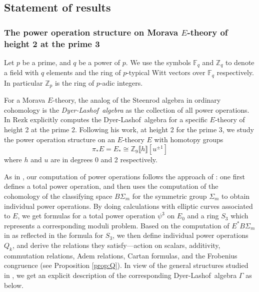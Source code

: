 \documentclass{gtpart}
\theoremstyle{definition}
\theoremstyle{remark}
\newcommand{\mb}[1]{\mathbb{#1}}
\newcommand{\DL}{Dyer-Lashof~}
\newcommand{\BF}{{\mb F}}
\newcommand{\BZ}{{\mb Z}}
\newcommand{\G}{\Gamma}
\newcommand{\p}{\psi^3}
\numberwithin{equation}{section}
\numberwithin{thm}{section}
\begin{document}
\subsection{Statement of results}
\label{subsec:res}

\subsubsection*{The power operation structure on Morava $E$-theory of height 2 at the prime 3}

Let $p$ be a prime, and $q$ be a power of $p$.  We use the symbols 
$\BF_q$ and $\BZ_q$ to denote a field with $q$ elements and the ring of 
$p$-typical Witt vectors over $\BF_q$ respectively.  In particular 
$\BZ_p$ is the ring of $p$-adic integers.  

For a Morava $E$-theory, the analog of the Steenrod algebra in ordinary 
cohomology is the {\em \DL algebra} as the collection of all power 
operations.  In \cite{h2p2} Rezk explicitly computes the \DL algebra for 
a specific $E$-theory of height 2 at the prime 2.  Following his work, 
at height 2 for the prime 3, we study the power operation structure on 
an $E$-theory $E$ with homotopy groups 
\[
 \pi_* E = E_* \cong \BZ_9 \llbracket h \rrbracket [u^{\pm 1}] 
\]
where $h$ and $u$ are in degrees 0 and 2 respectively.  

As in \cite{h2p2}, our computation of power operations follows the 
approach of \cite{steenrod}: one first defines a total power operation, 
and then uses the computation of the cohomology of the classifying space 
$B\Sigma_m$ for the symmetric group $\Sigma_m$ to obtain individual 
power operations.  By doing calculations with elliptic curves associated 
to $E$, we get formulas for a total power operation $\p$ on $E_0$ and a 
ring $S_3$ which represents a corresponding moduli problem.  Based on 
the computation of $E^* B\Sigma_m$ in \cite{Str98} as reflected in the 
formula for $S_3$, we then define individual power operations $Q_k$, and 
derive the relations they satisfy---action on scalars, additivity, 
commutation relations, Adem relations, Cartan formulas, and the 
Frobenius congruence (see Proposition \ref{prop:Q}).  In view of the 
general structures studied in \cite{cong}, we get an explicit 
description of the corresponding \DL algebra $\G$ as below.  
\end{document}
